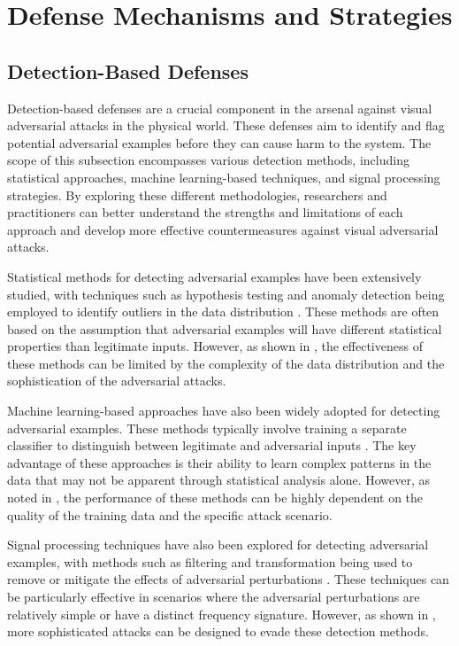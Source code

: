 \documentclass[11pt,a4paper]{article}
\begin{document}
\section{Defense Mechanisms and Strategies}



\subsection{Detection-Based Defenses}


Detection-based defenses are a crucial component in the arsenal against visual adversarial attacks in the physical world. These defenses aim to identify and flag potential adversarial examples before they can cause harm to the system. The scope of this subsection encompasses various detection methods, including statistical approaches, machine learning-based techniques, and signal processing strategies. By exploring these different methodologies, researchers and practitioners can better understand the strengths and limitations of each approach and develop more effective countermeasures against visual adversarial attacks.

Statistical methods for detecting adversarial examples have been extensively studied, with techniques such as hypothesis testing and anomaly detection being employed to identify outliers in the data distribution \cite{doi:10.1145/3128572.3140444}. These methods are often based on the assumption that adversarial examples will have different statistical properties than legitimate inputs. However, as shown in \cite{arxiv:1902.06705}, the effectiveness of these methods can be limited by the complexity of the data distribution and the sophistication of the adversarial attacks.

Machine learning-based approaches have also been widely adopted for detecting adversarial examples. These methods typically involve training a separate classifier to distinguish between legitimate and adversarial inputs \cite{arxiv:1810.00069}. The key advantage of these approaches is their ability to learn complex patterns in the data that may not be apparent through statistical analysis alone. However, as noted in \cite{doi:10.1016/j.cose.2020.102092}, the performance of these methods can be highly dependent on the quality of the training data and the specific attack scenario.

Signal processing techniques have also been explored for detecting adversarial examples, with methods such as filtering and transformation being used to remove or mitigate the effects of adversarial perturbations \cite{arxiv:1707.08945}. These techniques can be particularly effective in scenarios where the adversarial perturbations are relatively simple or have a distinct frequency signature. However, as shown in \cite{doi:10.1109/tnnls.2023.3321432}, more sophisticated attacks can be designed to evade these detection methods.
\end{document}
